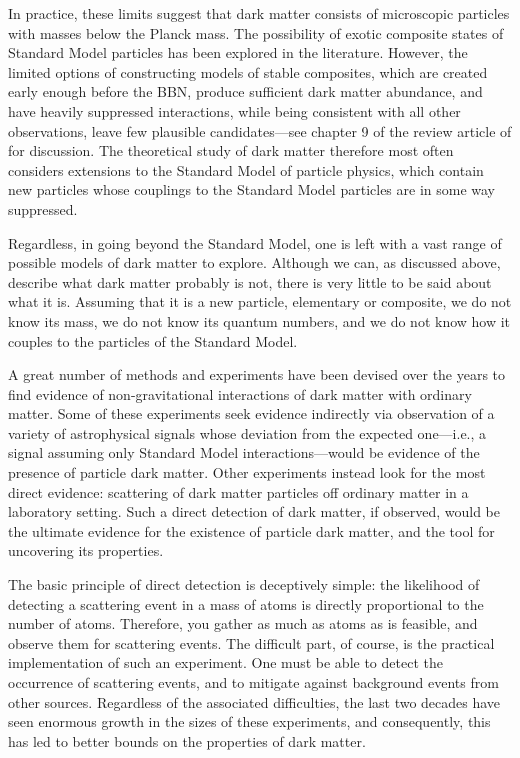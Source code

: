 \documentclass[b5paper, 10pt, twoside]{book}
\begin{document}
In practice, these limits suggest that dark matter consists of microscopic particles with masses below the Planck mass. The possibility of exotic composite states of Standard Model particles has been explored in the literature. However, the limited options of constructing models of stable composites, which are created early enough before the BBN, produce sufficient dark matter abundance, and have heavily suppressed interactions, while being consistent with all other observations, leave few plausible candidates---see chapter 9 of the review article of \textcite{CirelliStrumiaZupan2024} for discussion. The theoretical study of dark matter therefore most often considers extensions to the Standard Model of particle physics, which contain new particles whose couplings to the Standard Model particles are in some way suppressed.

Regardless, in going beyond the Standard Model, one is left with a vast range of possible models of dark matter to explore. Although we can, as discussed above, describe what dark matter probably is not, there is very little to be said about what it is. Assuming that it is a new particle, elementary or composite, we do not know its mass, we do not know its quantum numbers, and we do not know how it couples to the particles of the Standard Model.

A great number of methods and experiments have been devised over the years to find evidence of non-gravitational interactions of dark matter with ordinary matter. Some of these experiments seek evidence indirectly via observation of a variety of astrophysical signals whose deviation from the expected one---i.e., a signal assuming only Standard Model interactions---would be evidence of the presence of particle dark matter. Other experiments instead look for the most direct evidence: scattering of dark matter particles off ordinary matter in a laboratory setting. Such a direct detection of dark matter, if observed, would be the ultimate evidence for the existence of particle dark matter, and the tool for uncovering its properties.

The basic principle of direct detection is deceptively simple: the likelihood of detecting a scattering event in a mass of atoms is directly proportional to the number of atoms. Therefore, you gather as much as atoms as is feasible, and observe them for scattering events. The difficult part, of course, is the practical implementation of such an experiment. One must be able to detect the occurrence of scattering events, and to mitigate against background events from other sources. Regardless of the associated difficulties, the last two decades have seen enormous growth in the sizes of these experiments, and consequently, this has led to better bounds on the properties of dark matter.
\end{document}
